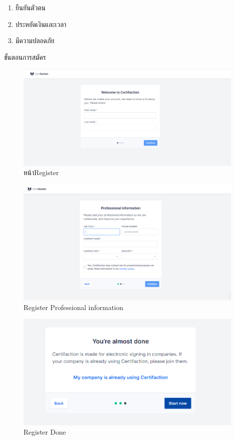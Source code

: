 \begin{enumerate}
  \item ยืนยันตัวตน
  \item ประหยัดเงินและเวลา
  \item มีความปลอดภัย
\end{enumerate}

ขั้นตอนการสมัคร

\enskip \enskip \enskip 
\graphicspath{ {./images/} }
\begin{figure}[htbp]
  \centering 
  \includegraphics[scale=0.3]{1.png}
  \caption[หน้าRegister]{หน้าRegister}
  \label{1}
\end{figure}

\enskip \enskip \enskip 
\graphicspath{ {./images/} }
\begin{figure}[htbp]
  \centering 
  \includegraphics[scale=0.3]{2.png}
  \caption[Register Professional information]{Register Professional information}
  \label{2}
\end{figure}

\enskip \enskip \enskip 
\graphicspath{ {./images/} }
\begin{figure}[htbp]
  \centering 
  \includegraphics[scale=0.3]{3.png}
  \caption[Register Done]{Register Done}
  \label{3}
\end{figure}

